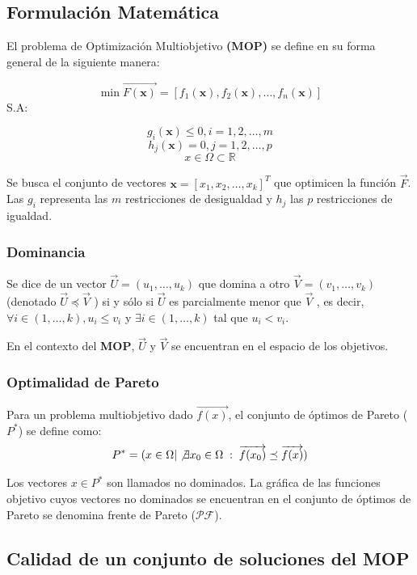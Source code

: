 \documentclass[letterpaper,10pt]{article}
\begin{document}
\subsection{Formulación Matemática}
El problema de Optimización Multiobjetivo \textbf{(MOP)} se define en su forma general de la siguiente manera:
 
$$\min \overrightarrow{F(\bm{x})} = \left[ f_1(\bm{x}), f_2(\bm{x}) , \dots, f_n(\bm{x}) \right] $$
S.A:
 
$$g_i(\bm{x}) \leq 0, i=1,2,\dots,m$$
$$h_j(\bm{x}) = 0, j=1,2,\dots,p$$
$$x \in \Omega \subset \mathbb{R}$$

Se busca el conjunto de vectores $\bm{x}=[x_1,x_2,\dots,x_k]^T$ que optimicen la función $\overrightarrow{F}$. Las $g_i$ representa las $m$ restricciones de desigualdad y $h_j$ las $p$ restricciones de igualdad.

\subsubsection{Dominancia}

Se dice de un vector $\overrightarrow{U}= (u_1 ,\dots, u_k )$ que domina a otro $\overrightarrow{V}= (v_1 ,\dots, v_k )$ (denotado $\overrightarrow{U} \preceq \overrightarrow{V}$ ) si y sólo si $\overrightarrow{U}$ es parcialmente menor que $\overrightarrow{V}$ , es decir,
$\forall i \in (1,\dots, k), u_i \leq v_i$ y $\exists i \in (1,\dots, k)$ tal que  $u_i<v_i$.

En el contexto del \textbf{MOP},  $\overrightarrow{U}$ y $\overrightarrow{V}$ se encuentran en el espacio de los objetivos.
 
\subsubsection{Optimalidad de Pareto}

Para un problema multiobjetivo dado $\overrightarrow{f(x)}$, el conjunto de óptimos de Pareto ($P^*$) se define como:
$$P^* = ( x \in \Omega | \not\exists x_0 \in \Omega \; : \; \overrightarrow{f(x_0)} \preceq \overrightarrow{f(x)})$$
 
Los vectores $x \in P^*$ son llamados no dominados. La gráfica de las funciones objetivo cuyos vectores no dominados se encuentran
en el conjunto de óptimos de Pareto se denomina frente de Pareto ($\mathcal{PF}$).
 
 
\subsection{Calidad de un conjunto de soluciones del MOP}
 
\end{document}
